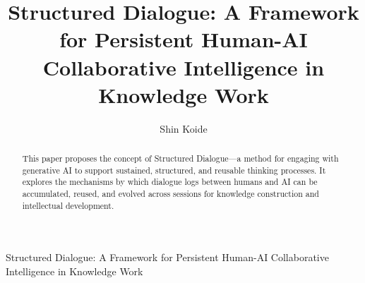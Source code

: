 \documentclass[11pt]{article}
\title{Structured Dialogue: A Framework for Persistent Human-AI Collaborative Intelligence in Knowledge Work}
\author{Shin Koide}
\affil{Independent Researcher\\ \texttt{nextbs@gmail.com}}
\date{}
\begin{document}
\maketitle
\setlength{\textfloatsep}{10pt}    %
\setlength{\floatsep}{10pt}        %
\begin{abstract}
This paper proposes the concept of Structured Dialogue—a method for engaging with generative AI to support sustained, structured, and reusable thinking processes. It explores the mechanisms by which dialogue logs between humans and AI can be accumulated, reused, and evolved across sessions for knowledge construction and intellectual development.
\end{abstract}

Structured Dialogue: A Framework for Persistent Human-AI Collaborative Intelligence in Knowledge Work
\end{document}
